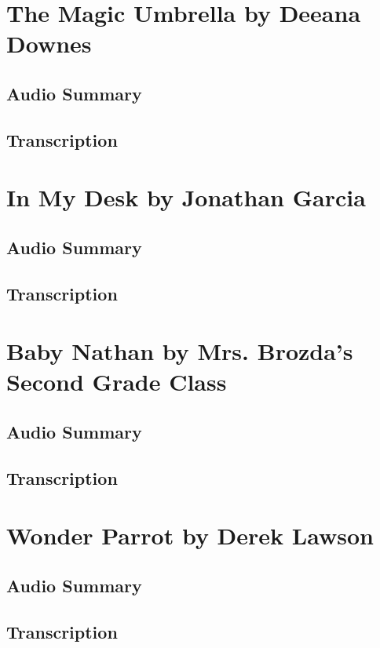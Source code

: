 \section{The Magic Umbrella by Deeana Downes}

\subsection{Audio Summary}

\subsection{Transcription}

\section{In My Desk by Jonathan Garcia}

\subsection{Audio Summary}

\subsection{Transcription}

\section{Baby Nathan by Mrs. Brozda's Second Grade Class}

\subsection{Audio Summary}

\subsection{Transcription}

\section{Wonder Parrot by Derek Lawson}

\subsection{Audio Summary}

\subsection{Transcription}

